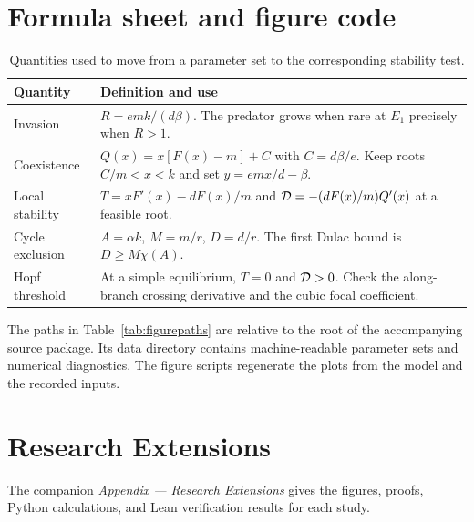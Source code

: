 \clearpage
\appendix
\section{Formula sheet and figure code}\label{sec:figurecode}
\begin{table}[!htbp]\centering
\caption{Quantities used to move from a parameter set to the corresponding stability test.}
\label{tab:formulasheet}
\begin{tabularx}{\linewidth}{@{}lY@{}}\toprule
Quantity & Definition and use\\ \midrule
Invasion & \(R=emk/(d\beta)\). The predator grows when rare at \(E_1\) precisely when \(R>1\).\\
Coexistence & \(Q(x)=x[F(x)-m]+C\) with \(C=d\beta/e\). Keep roots \(C/m<x<k\) and set \(y=emx/d-\beta\).\\
Local stability & \(T=xF'(x)-dF(x)/m\) and \(\mathcal D=-(dF(x)/m)Q'(x)\) at a feasible root.\\
Cycle exclusion & \(A=\alpha k\), \(M=m/r\), \(D=d/r\). The first Dulac bound is \(D\ge M\chi(A)\).\\
Hopf threshold & At a simple equilibrium, \(T=0\) and \(\mathcal D>0\). Check the along-branch crossing derivative and the cubic focal coefficient.\\
\bottomrule\end{tabularx}
\end{table}

The paths in Table~\ref{tab:figurepaths} are relative to the root of the accompanying source package. Its data directory contains machine-readable parameter sets and numerical diagnostics. The figure scripts regenerate the plots from the model and the recorded inputs.


\clearpage


\clearpage
\section{Research Extensions}\label{sec:extensions}

\medskip

\noindent The companion \textit{Appendix --- Research Extensions} gives the figures, proofs, Python calculations, and Lean verification results for each study.

